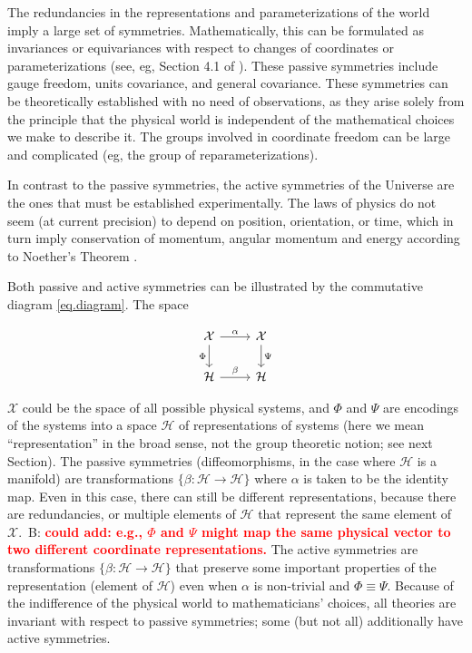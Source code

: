 \documentclass{article}
\newcommand{\bernhard}[1]{~B: \textcolor{red}{\textbf{#1}}}
\begin{document}
The redundancies in the representations and parameterizations of the world imply a large set of symmetries.
Mathematically, this can be formulated as invariances or equivariances with respect to changes of coordinates or parameterizations (see, eg, Section 4.1 of \cite{rovelli2000loop}).
These passive symmetries include gauge freedom, units covariance, and general covariance.
These symmetries can be theoretically established with no need of observations, as they arise solely from the principle that the physical world is independent of the mathematical choices we make to describe it.
The groups involved in coordinate freedom can be large and complicated (eg, the group of reparameterizations).

In contrast to the passive symmetries, the active symmetries of the Universe are the ones that must be established experimentally.
The laws of physics do not seem (at current precision) to depend on position, orientation, or time, which in turn imply conservation of momentum, angular momentum and energy according to Noether's Theorem \cite{noether}.

Both passive and active symmetries can be illustrated by the commutative diagram \eqref{eq.diagram}. 
The space
\begin{wrapfigure}{r}{3.3cm}
\vspace{-3ex}
\begin{equation}\label{eq.diagram}
\begin{tikzcd}[]
  {\cal X}\arrow[r,"\alpha"] \arrow[d,"\Phi",swap] & {\cal X}  \arrow[d,"\Psi"]\\
{\cal H} \arrow[r,"\beta"]  & {\cal H} 
\end{tikzcd}
\end{equation}
\vspace{-3ex}
\end{wrapfigure}
$\mathcal X$ could be the space of all possible physical systems, and $\Phi$ and $\Psi$ are encodings of the systems into a space $\mathcal H$ of representations of systems (here we mean ``representation'' in the broad sense, not the group theoretic notion; see next Section).
The passive symmetries (diffeomorphisms, in the case where $\mathcal H$ is a manifold) are transformations $\{\beta:\mathcal H \to \mathcal H\}$ where $\alpha$ is taken to be the identity map.
Even in this case, there can still be different representations, because there are redundancies, or multiple elements of $\mathcal H$ that represent the same element of $\mathcal X$.\bernhard{could add: e.g., $\Phi$ and $\Psi$ might map the same physical vector to two different coordinate representations.}
The active symmetries are transformations $\{\beta:\mathcal H \to \mathcal H\}$ that preserve some important properties of the representation (element of $\mathcal H$) even when $\alpha$ is non-trivial and $\Phi\equiv \Psi$.
Because of the indifference of the physical world to mathematicians' choices, all theories are invariant with respect to passive symmetries; some (but not all) additionally have active symmetries.
\end{document}
